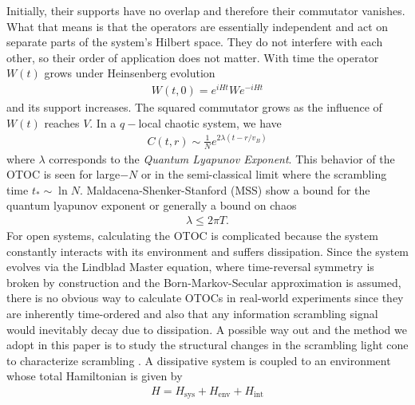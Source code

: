 \documentclass[aps,pra,reprint,amsmath,amssymb]{revtex4-2}
\newcommand{\hsys}[0]{H_{\text{sys}}}
\newcommand{\henv}[0]{H_{\text{env}}}
\newcommand{\hint}[0]{H_{\text{int}}}
\begin{document}
Initially, their supports have no overlap and therefore their commutator vanishes. What that means is that the operators are essentially independent and act on separate parts of the system's Hilbert space. They do not interfere with each other, so their order of application does not matter. With time the operator $W(t)$ grows under Heinsenberg evolution 
\begin{align}
    W(t,0) = e^{iHt}We^{-iHt}
\end{align}
and its support increases. The squared commutator grows as the influence of $W(t)$ reaches $V$.
In a $q-$local chaotic system, we have 
\begin{align}
    C(t,r) \sim \frac{1}{N} e^{2 \lambda(t-r/v_B)}
\end{align}
where $\lambda$ corresponds to the {\it Quantum Lyapunov Exponent}. This behavior of the OTOC is seen for large$-N$ or in the semi-classical limit where the scrambling time $t_* \sim \ln N$. Maldacena-Shenker-Stanford (MSS) show a bound for the quantum lyapunov exponent or generally a bound on chaos \cite{maldacena2016bound}
\begin{align*}
    \lambda \leq 2 \pi T.
\end{align*}
For open systems, calculating the OTOC is complicated because the system constantly interacts with its environment and suffers dissipation. Since the system evolves via the Lindblad Master equation, where time-reversal symmetry is broken by construction and the Born-Markov-Secular approximation is assumed, there is no obvious way to calculate OTOCs in real-world experiments since they are inherently time-ordered and also that any information scrambling signal would inevitably decay due to dissipation. A possible way out and the method we adopt in this paper is to study the structural changes in the scrambling light cone to characterize scrambling \cite{zhang2019information}. A dissipative system is coupled to an environment whose total Hamiltonian is given by
\begin{align*}
    H=\hsys+\henv+\hint
\end{align*}
\end{document}
